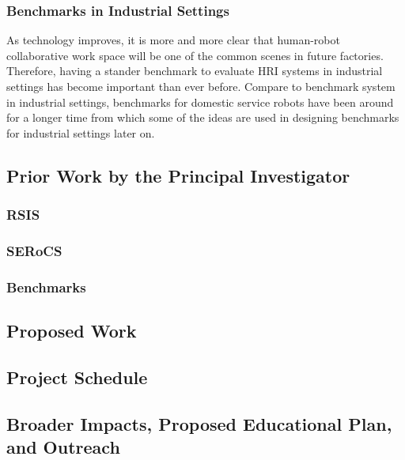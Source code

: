\subsubsection{Benchmarks in Industrial Settings}

As technology improves, it is more and more clear that human-robot collaborative work space will be one of the common scenes in future factories. Therefore, having a stander benchmark to evaluate HRI systems in industrial settings has become important than ever before. Compare to benchmark system in industrial settings, benchmarks for domestic service robots
have been around for a longer time \cite{wisspeintner2009robocup} from which some of the ideas are used in designing benchmarks for industrial settings later on.       

\subsection{Prior Work by the Principal Investigator}

\subsubsection{RSIS}

\subsubsection{SERoCS}

\subsubsection{Benchmarks}

\subsection{Proposed Work}







\subsection{Project Schedule}





\subsection{Broader Impacts, Proposed Educational Plan, and Outreach}

